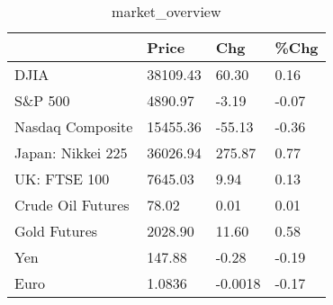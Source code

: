 \documentclass{article}%
\begin{document}
%


\begin{table}[htbp]%
\caption{market\_overview}%
\centering%
\begin{adjustbox}{width=1\textwidth}%
\begin{tabular}{llll}
\toprule
                  &    Price &     Chg &  \%Chg \\
\midrule
             DJIA & 38109.43 &   60.30 &  0.16 \\
          S\&P 500 &  4890.97 &   -3.19 & -0.07 \\
 Nasdaq Composite & 15455.36 &  -55.13 & -0.36 \\
Japan: Nikkei 225 & 36026.94 &  275.87 &  0.77 \\
     UK: FTSE 100 &  7645.03 &    9.94 &  0.13 \\
Crude Oil Futures &    78.02 &    0.01 &  0.01 \\
     Gold Futures &  2028.90 &   11.60 &  0.58 \\
              Yen &   147.88 &   -0.28 & -0.19 \\
             Euro &   1.0836 & -0.0018 & -0.17 \\
\bottomrule
\end{tabular}
%
\end{adjustbox}%
\end{table}

%
\end{document}
